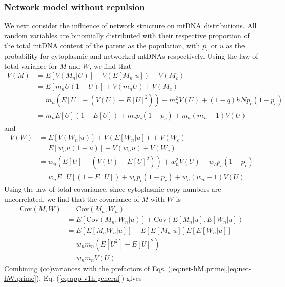 \documentclass{article}
\begin{document}
\begin{appendices}
\subsubsection*{Network model without repulsion}
We next consider the influence of network structure on mtDNA distributions. All random variables are binomially distributed with their respective proportion of the total mtDNA content of the parent as the population, with $p_c$ or $u$ as the probability for cytoplasmic and networked mtDNAs respectively. Using the law of total variance for $M$ and $W$, we find that
\begin{equation}\label{eq:app-vm-net}
    \begin{split}
   V(M) & = E[V(M_n|U)]+V(E[M_n|u])+V(M_c)\\
        & = E[m_nU(1-U)]+V(m_nU)+V(M_c)\\
        & = m_n(E[U]-(V(U)+E[U]^2))+m_n^2V(U)+(1-q)hNp_c(1-p_c)\\
        & = m_nE[U](1-E[U])+m_cp_c(1-p_c)+m_n(m_n-1)V(U)
    \end{split}
\end{equation}
and
\begin{equation}\label{eq:app-vw-net}
    \begin{split}
   V(W) & = E[V(W_n|u)]+V(E[W_n|u])+V(W_c)\\
        & = E[w_nu(1-u)]+V(w_nu)+V(W_c)\\
        & = w_n(E[U]-(V(U)+E[U]^2))+w_n^2V(U)+w_cp_c(1-p_c)\\
        & = w_nE[U](1-E[U])+w_cp_c(1-p_c)+w_n(w_n-1)V(U)
    \end{split}
\end{equation}
Using the law of total covariance, since cytoplasmic copy numbers are uncorrelated, we find that the covariance of $M$ with $W$ is
\begin{equation}\label{eq:app-cmw-net}
    \begin{split}
  \mathrm{Cov}(M,W) & = \mathrm{Cov}(M_n,W_n) \\
    & = E[\mathrm{Cov}(M_n,W_n|u)]+\mathrm{Cov}(E[M_n|u],E[W_n|u])\\ 
    & = E[E[M_nW_n|u]]-E[E[M_n|u]]E[E[W_n|u]]\\
    & = w_nm_n(E[U^2]-E[U]^2)\\
    & = w_nm_nV(U)
    \end{split}
\end{equation}
Combining (co)variances with the prefactors of Eqs. (\ref{eq:net-hM.prime},\ref{eq:net-hW.prime}), Eq. (\ref{eq:app-v1h-general}) gives

\end{appendices}
\end{document}
